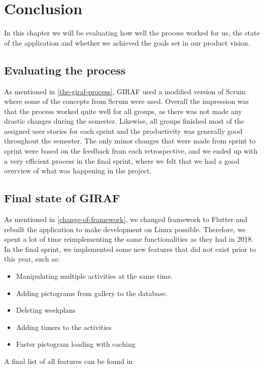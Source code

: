 \chapter{Conclusion}
In this chapter we will be evaluating how well the process worked for us, the state of the application and whether we achieved the goals set in our product vision.

\section{Evaluating the process}
As mentioned in \autoref{the-giraf-process}, GIRAF used a modified version of Scrum where some of the concepts from Scrum were used.
Overall the impression was that the process worked quite well for all groups, as there was not made any drastic changes during the semester.
Likewise, all groups finished most of the assigned user stories for each sprint and the productivity was generally good throughout the semester.
The only minor changes that were made from sprint to sprint were based on the feedback from each retrospective, and we ended up with a very efficient process in the final sprint, where we felt that we had a good overview of what was happening in the project.

\section{Final state of GIRAF}
As mentioned in \autoref{change-of-framework}, we changed framework to Flutter and rebuilt the application to make development on Linux possible.
Therefore, we spent a lot of time reimplementing the same functionalities as they had in 2018.
In the final sprint, we implemented some new features that did not exist prior to this year, such as:
\begin{itemize}
    \item Manipulating multiple activities at the same time.
    \item Adding pictograms from gallery to the database.
    \item Deleting weekplans
    \item Adding timers to the activities
    \item Faster pictogram loading with caching
\end{itemize}
A final list of all features can be found in 

